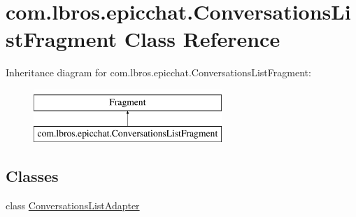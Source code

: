 \hypertarget{classcom_1_1lbros_1_1epicchat_1_1_conversations_list_fragment}{\section{com.\-lbros.\-epicchat.\-Conversations\-List\-Fragment Class Reference}
\label{classcom_1_1lbros_1_1epicchat_1_1_conversations_list_fragment}
}
Inheritance diagram for com.\-lbros.\-epicchat.\-Conversations\-List\-Fragment\-:\begin{figure}[H]
\begin{center}
\leavevmode
\includegraphics[height=2.000000cm]{classcom_1_1lbros_1_1epicchat_1_1_conversations_list_fragment}
\end{center}
\end{figure}
\subsection*{Classes}
\begin{DoxyCompactItemize}
\item 
class \hyperlink{classcom_1_1lbros_1_1epicchat_1_1_conversations_list_fragment_1_1_conversations_list_adapter}{Conversations\-List\-Adapter}
\end{DoxyCompactItemize}
